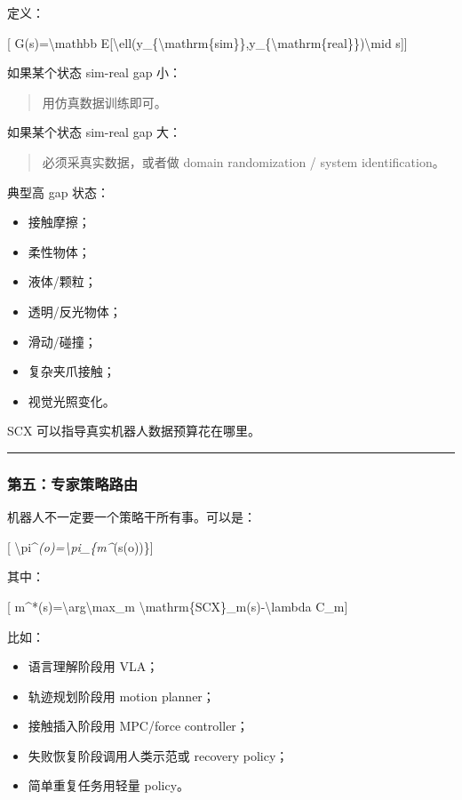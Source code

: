 \documentclass[
  12pt,
]{ctexart}
\providecommand{\tightlist}{%
  \setlength{\itemsep}{0pt}\setlength{\parskip}{0pt}}
\begin{document}
定义：

{[} G(s)=\textbackslash mathbb
E{[}\textbackslash ell(y\_\{\textbackslash mathrm\{sim\}\},y\_\{\textbackslash mathrm\{real\}\})\textbackslash mid
s{]}{]}

如果某个状态 sim-real gap 小：

\begin{quote}
用仿真数据训练即可。
\end{quote}

如果某个状态 sim-real gap 大：

\begin{quote}
必须采真实数据，或者做 domain randomization / system identification。
\end{quote}

典型高 gap 状态：

\begin{itemize}
\tightlist
\item
  接触摩擦；
\item
  柔性物体；
\item
  液体/颗粒；
\item
  透明/反光物体；
\item
  滑动/碰撞；
\item
  复杂夹爪接触；
\item
  视觉光照变化。
\end{itemize}

SCX 可以指导真实机器人数据预算花在哪里。

\begin{center}\rule{0.5\linewidth}{0.5pt}\end{center}

\subsubsection{第五：专家策略路由}\label{ux7b2cux4e94ux4e13ux5bb6ux7b56ux7565ux8defux7531}

机器人不一定要一个策略干所有事。可以是：

{[}
\textbackslash pi\^{}\emph{(o)=\textbackslash pi\_\{m\^{}}(s(o))\}{]}

其中：

{[} m\^{}*(s)=\textbackslash arg\textbackslash max\_m
\textbackslash mathrm\{SCX\}\_m(s)-\textbackslash lambda C\_m{]}

比如：

\begin{itemize}
\tightlist
\item
  语言理解阶段用 VLA；
\item
  轨迹规划阶段用 motion planner；
\item
  接触插入阶段用 MPC/force controller；
\item
  失败恢复阶段调用人类示范或 recovery policy；
\item
  简单重复任务用轻量 policy。
\end{itemize}
\end{document}
